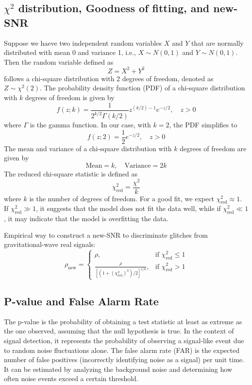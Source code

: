 \documentclass[12pt, a4paper]{article}
\theoremstyle{plain} %
\theoremstyle{definition} %
\begin{document}
\subsection*{$\chi^2$ distribution, Goodness of fitting, and new-SNR}
Suppose we haeve two independent random variables $X$ and $Y$ that are normally distributed with mean 0 and variance 1, i.e., $X \sim N(0,1)$ and $Y \sim N(0,1)$. Then the random variable defined as
\begin{equation}
    Z = X^2 + Y^2
\end{equation}
follows a chi-square distribution with 2 degrees of freedom, denoted as $Z \sim \chi^2(2)$. The probability density function (PDF) of a chi-square distribution with $k$ degrees of freedom is given by
\begin{equation}
    f(z; k) = \frac{1}{2^{k/2} \Gamma(k/2)} z^{(k/2)-1} e^{-z/2}, \quad z > 0
\end{equation}
where $\Gamma$ is the gamma function. In our case, with $k=2$, the PDF simplifies to
\begin{equation}
    f(z; 2) = \frac{1}{2} e^{-z/2}, \quad z > 0
\end{equation}
The mean and variance of a chi-square distribution with $k$ degrees of freedom are given by
\begin{equation}
    \text{Mean} = k, \quad \text{Variance} = 2k
\end{equation}
The reduced chi-square statistic is defined as
\begin{equation}
    \chi^2_{\text{red}} = \frac{\chi^2}{k}
\end{equation}
where $k$ is the number of degrees of freedom. For a good fit, we expect $\chi^2_{\text{red}} \approx 1$. If $\chi^2_{\text{red}} \gg 1$, it suggests that the model does not fit the data well, while if $\chi^2_{\text{red}} \ll 1$, it may indicate that the model is overfitting the data.

Empirical way to construct a new-SNR to discriminate glitches from gravitational-wave real signals:
\begin{equation}
    \rho_{\text{new}} = \begin{cases}
    \rho, & \text{if } \chi^2_{\text{red}} \leq 1 \\
    \frac{\rho}{\left[ (1 + (\chi^2_{\text{red}})^3) / 2 \right]^{1/6}}, & \text{if } \chi^2_{\text{red}} > 1
    \end{cases}
\end{equation}

\subsection*{P-value and False Alarm Rate}
The p-value is the probability of obtaining a test statistic at least as extreme as the one observed, assuming that the null hypothesis is true. In the context of signal detection, it represents the probability of observing a signal-like event due to random noise fluctuations alone.
The false alarm rate (FAR) is the expected number of false positives (incorrectly identifying noise as a signal) per unit time. It can be estimated by analyzing the background noise and determining how often noise events exceed a certain threshold.
\end{document}
